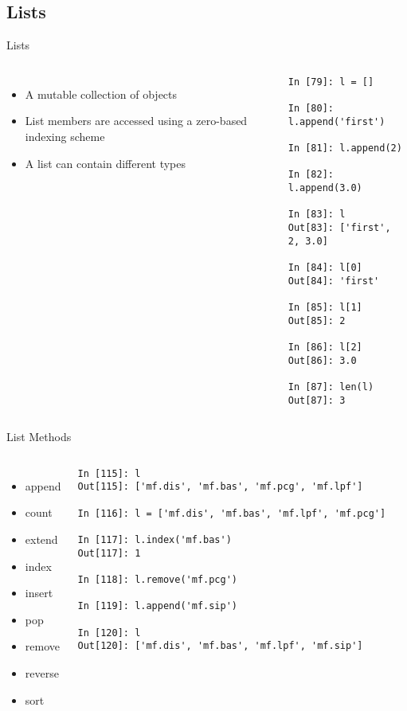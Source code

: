\documentclass{beamer}
\begin{document}
\subsection{Lists}
\begin{frame}[fragile]{Lists}
\begin{columns}[c]
\column{2.5in}
\begin{itemize}
\item{A mutable collection of objects}
\item{List members are accessed using a zero-based indexing scheme}
\item{A list can contain different types}
\end{itemize}

\column{2.5in}
\tiny
\begin{lstlisting}
In [79]: l = []

In [80]: l.append('first')

In [81]: l.append(2)

In [82]: l.append(3.0)

In [83]: l
Out[83]: ['first', 2, 3.0]

In [84]: l[0]
Out[84]: 'first'

In [85]: l[1]
Out[85]: 2

In [86]: l[2]
Out[86]: 3.0

In [87]: len(l)
Out[87]: 3
\end{lstlisting}
\end{columns}
\end{frame}

\begin{frame}[fragile]{List Methods}
\begin{columns}[c]
\column{2.5in}
\begin{itemize}
\item{append}
\item{count}
\item{extend}
\item{index}
\item{insert}
\item{pop}
\item{remove}
\item{reverse}
\item{sort}
\end{itemize}

\column{2.5in}
\begin{lstlisting}
In [115]: l
Out[115]: ['mf.dis', 'mf.bas', 'mf.pcg', 'mf.lpf']

In [116]: l = ['mf.dis', 'mf.bas', 'mf.lpf', 'mf.pcg']

In [117]: l.index('mf.bas')
Out[117]: 1

In [118]: l.remove('mf.pcg')

In [119]: l.append('mf.sip')

In [120]: l
Out[120]: ['mf.dis', 'mf.bas', 'mf.lpf', 'mf.sip']
\end{lstlisting}
\end{columns}
\end{frame}
\end{document}
